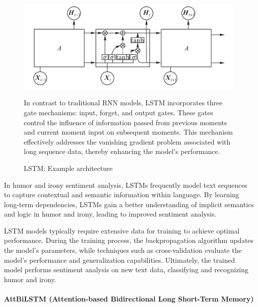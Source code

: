 \documentclass[a4paper]{article}
\begin{document}
\begin{figure}[H]
    \centering
    \begin{minipage}{0.48\textwidth}
        \centering
        \includegraphics[width=1\textwidth]{./images/LSTM_architecture.png}
        \caption{LSTM: Example architecture}
        \label{fig.LSTM[Review of applications of natural language processing in text sentiment analysis]}
    \end{minipage}\hfill
    \begin{minipage}{0.48\textwidth}
        In contrast to traditional RNN models, LSTM incorporates three gate mechanisms: input, forget, and output gates. These gates control the influence of information passed from previous moments and current moment input on subsequent moments. This mechanism effectively addresses the vanishing gradient problem associated with long sequence data, thereby enhancing the model's performance.
    \end{minipage}
\end{figure}

In humor and irony sentiment analysis, LSTMs frequently model text sequences to capture contextual and semantic information within language. By learning long-term dependencies, LSTMs gain a better understanding of implicit semantics and logic in humor and irony, leading to improved sentiment analysis.

LSTM models typically require extensive data for training to achieve optimal performance. During the training process, the backpropagation algorithm updates the model's parameters, while techniques such as cross-validation evaluate the model's performance and generalization capabilities. Ultimately, the trained model performs sentiment analysis on new text data, classifying and recognizing humor and irony.

\paragraph{AttBiLSTM (Attention-based Bidirectional Long Short-Term Memory)}
\end{document}
